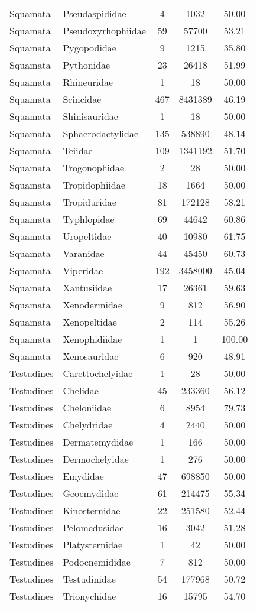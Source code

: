 \begin{longtable}{llccc}
  Squamata & Pseudaspididae &   4 & 1032 & 50.00 \\ 
  Squamata & Pseudoxyrhophiidae &  59 & 57700 & 53.21 \\ 
  Squamata & Pygopodidae &   9 & 1215 & 35.80 \\ 
  Squamata & Pythonidae &  23 & 26418 & 51.99 \\ 
  Squamata & Rhineuridae &   1 &  18 & 50.00 \\ 
  Squamata & Scincidae & 467 & 8431389 & 46.19 \\ 
  Squamata & Shinisauridae &   1 &  18 & 50.00 \\ 
  Squamata & Sphaerodactylidae & 135 & 538890 & 48.14 \\ 
  Squamata & Teiidae & 109 & 1341192 & 51.70 \\ 
  Squamata & Trogonophidae &   2 &  28 & 50.00 \\ 
  Squamata & Tropidophiidae &  18 & 1664 & 50.00 \\ 
  Squamata & Tropiduridae &  81 & 172128 & 58.21 \\ 
  Squamata & Typhlopidae &  69 & 44642 & 60.86 \\ 
  Squamata & Uropeltidae &  40 & 10980 & 61.75 \\ 
  Squamata & Varanidae &  44 & 45450 & 60.73 \\ 
  Squamata & Viperidae & 192 & 3458000 & 45.04 \\ 
  Squamata & Xantusiidae &  17 & 26361 & 59.63 \\ 
  Squamata & Xenodermidae &   9 & 812 & 56.90 \\ 
  Squamata & Xenopeltidae &   2 & 114 & 55.26 \\ 
  Squamata & Xenophidiidae &   1 &   1 & 100.00 \\ 
  Squamata & Xenosauridae &   6 & 920 & 48.91 \\ 
  Testudines & Carettochelyidae &   1 &  28 & 50.00 \\ 
  Testudines & Chelidae &  45 & 233360 & 56.12 \\ 
  Testudines & Cheloniidae &   6 & 8954 & 79.73 \\ 
  Testudines & Chelydridae &   4 & 2440 & 50.00 \\ 
  Testudines & Dermatemydidae &   1 & 166 & 50.00 \\ 
  Testudines & Dermochelyidae &   1 & 276 & 50.00 \\ 
  Testudines & Emydidae &  47 & 698850 & 50.00 \\ 
  Testudines & Geoemydidae &  61 & 214475 & 55.34 \\ 
  Testudines & Kinosternidae &  22 & 251580 & 52.44 \\ 
  Testudines & Pelomedusidae &  16 & 3042 & 51.28 \\ 
  Testudines & Platysternidae &   1 &  42 & 50.00 \\ 
  Testudines & Podocnemididae &   7 & 812 & 50.00 \\ 
  Testudines & Testudinidae &  54 & 177968 & 50.72 \\ 
  Testudines & Trionychidae &  16 & 15795 & 54.70 \\ 
   \hline
\label{table-family_reptiles}
\end{longtable}

